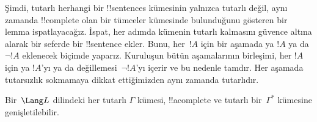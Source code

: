 

      {}
      {}


\begin{explain}
Şimdi, tutarlı herhangi bir !!{sentence}s kümesinin yalnızca tutarlı
değil, aynı zamanda !!{complete} olan bir tümceler kümesinde
bulunduğunu gösteren bir lemma ispatlayacağız. İspat, her adımda kümenin
tutarlı kalmasını güvence altına alarak bir seferde bir !!{sentence}
ekler. Bunu, her~$!A$ için bir aşamada ya $!A$ ya da $\lnot !A$
eklenecek biçimde yaparız. Kuruluşun bütün aşamalarının birleşimi, her
$!A$ için ya $!A$'yı ya da değillemesi~$\lnot !A$'yı içerir ve bu
nedenle tamdır. Her aşamada tutarsızlık sokmamaya dikkat ettiğimizden
aynı zamanda tutarlıdır.
\end{explain}

\begin{lem}
 Bir~$\Lang L$ dilindeki her tutarlı
$\Gamma$ kümesi, !!a{complete} ve tutarlı bir~$\Gamma^*$ kümesine
genişletilebilir.
\end{lem}

